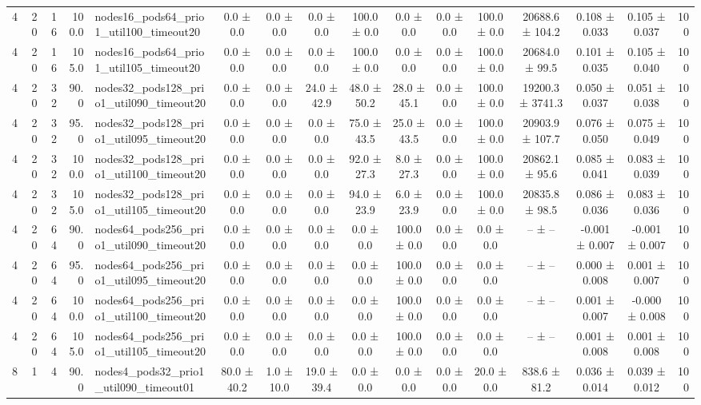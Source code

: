 \begin{tabular}{r r r r l c c c c c c c c c c r}
4 & 20 & 16 & 100.0 & nodes16\_pods64\_prio1\_util100\_timeout20 & 0.0 ± 0.0 & 0.0 ± 0.0 & 0.0 ± 0.0 & 100.0 ± 0.0 & 0.0 ± 0.0 & 0.0 ± 0.0 & 100.0 ± 0.0 & 20688.6 ± 104.2 & 0.108 ± 0.033 & 0.105 ± 0.037 & 100 \\
4 & 20 & 16 & 105.0 & nodes16\_pods64\_prio1\_util105\_timeout20 & 0.0 ± 0.0 & 0.0 ± 0.0 & 0.0 ± 0.0 & 100.0 ± 0.0 & 0.0 ± 0.0 & 0.0 ± 0.0 & 100.0 ± 0.0 & 20684.0 ± 99.5 & 0.101 ± 0.035 & 0.105 ± 0.040 & 100 \\
4 & 20 & 32 & 90.0 & nodes32\_pods128\_prio1\_util090\_timeout20 & 0.0 ± 0.0 & 0.0 ± 0.0 & 24.0 ± 42.9 & 48.0 ± 50.2 & 28.0 ± 45.1 & 0.0 ± 0.0 & 100.0 ± 0.0 & 19200.3 ± 3741.3 & 0.050 ± 0.037 & 0.051 ± 0.038 & 100 \\
4 & 20 & 32 & 95.0 & nodes32\_pods128\_prio1\_util095\_timeout20 & 0.0 ± 0.0 & 0.0 ± 0.0 & 0.0 ± 0.0 & 75.0 ± 43.5 & 25.0 ± 43.5 & 0.0 ± 0.0 & 100.0 ± 0.0 & 20903.9 ± 107.7 & 0.076 ± 0.050 & 0.075 ± 0.049 & 100 \\
4 & 20 & 32 & 100.0 & nodes32\_pods128\_prio1\_util100\_timeout20 & 0.0 ± 0.0 & 0.0 ± 0.0 & 0.0 ± 0.0 & 92.0 ± 27.3 & 8.0 ± 27.3 & 0.0 ± 0.0 & 100.0 ± 0.0 & 20862.1 ± 95.6 & 0.085 ± 0.041 & 0.083 ± 0.039 & 100 \\
4 & 20 & 32 & 105.0 & nodes32\_pods128\_prio1\_util105\_timeout20 & 0.0 ± 0.0 & 0.0 ± 0.0 & 0.0 ± 0.0 & 94.0 ± 23.9 & 6.0 ± 23.9 & 0.0 ± 0.0 & 100.0 ± 0.0 & 20835.8 ± 98.5 & 0.086 ± 0.036 & 0.083 ± 0.036 & 100 \\
4 & 20 & 64 & 90.0 & nodes64\_pods256\_prio1\_util090\_timeout20 & 0.0 ± 0.0 & 0.0 ± 0.0 & 0.0 ± 0.0 & 0.0 ± 0.0 & 100.0 ± 0.0 & 0.0 ± 0.0 & 0.0 ± 0.0 & -- ± -- & -0.001 ± 0.007 & -0.001 ± 0.007 & 100 \\
4 & 20 & 64 & 95.0 & nodes64\_pods256\_prio1\_util095\_timeout20 & 0.0 ± 0.0 & 0.0 ± 0.0 & 0.0 ± 0.0 & 0.0 ± 0.0 & 100.0 ± 0.0 & 0.0 ± 0.0 & 0.0 ± 0.0 & -- ± -- & 0.000 ± 0.008 & 0.001 ± 0.007 & 100 \\
4 & 20 & 64 & 100.0 & nodes64\_pods256\_prio1\_util100\_timeout20 & 0.0 ± 0.0 & 0.0 ± 0.0 & 0.0 ± 0.0 & 0.0 ± 0.0 & 100.0 ± 0.0 & 0.0 ± 0.0 & 0.0 ± 0.0 & -- ± -- & 0.001 ± 0.007 & -0.000 ± 0.008 & 100 \\
4 & 20 & 64 & 105.0 & nodes64\_pods256\_prio1\_util105\_timeout20 & 0.0 ± 0.0 & 0.0 ± 0.0 & 0.0 ± 0.0 & 0.0 ± 0.0 & 100.0 ± 0.0 & 0.0 ± 0.0 & 0.0 ± 0.0 & -- ± -- & 0.001 ± 0.008 & 0.001 ± 0.008 & 100 \\
8 & 1 & 4 & 90.0 & nodes4\_pods32\_prio1\_util090\_timeout01 & 80.0 ± 40.2 & 1.0 ± 10.0 & 19.0 ± 39.4 & 0.0 ± 0.0 & 0.0 ± 0.0 & 0.0 ± 0.0 & 20.0 ± 0.0 & 838.6 ± 81.2 & 0.036 ± 0.014 & 0.039 ± 0.012 & 100 \\

\end{tabular}
